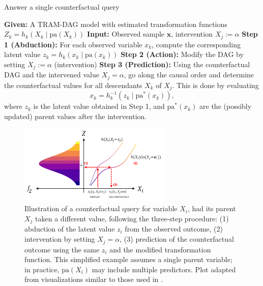 \begin{algorithm}[!ht]
\caption{Answer a single counterfactual query}
\label{alg:single_cf}
\begin{algorithmic}
\State \textbf{Given:} A TRAM-DAG model with estimated transformation functions $Z_k = h_k(X_k \mid \text{pa}(X_k))$
\State \textbf{Input:} Observed sample $\mathbf{x}$, intervention $X_j := \alpha$
\vspace{0.3em}
\State \textbf{Step 1 (Abduction):} For each observed variable $x_k$, compute the corresponding latent value $z_k = h_k(x_k \mid \text{pa}(x_k))$
\vspace{0.3em}
\State \textbf{Step 2 (Action):} Modify the DAG by setting $X_j := \alpha$ (intervention)
\vspace{0.3em}
\State \textbf{Step 3 (Prediction):} Using the counterfactual DAG and the intervened value $X_j = \alpha$, go along the causal order and determine the counterfactual values for all descendants $X_k$ of $X_j$. This is done by evaluating
\[
x_k = h_k^{-1}(z_k \mid \text{pa}^*(x_k)),
\]
where $z_k$ is the latent value obtained in Step 1, and $\text{pa}^*(x_k)$ are the (possibly updated) parent values after the intervention.
\end{algorithmic}
\end{algorithm}

\begin{figure}[!ht]
\centering
\includegraphics[width=0.65\textwidth]{img/counterfactuals.png}
\caption{Illustration of a counterfactual query for variable $X_i$, had its parent $X_j$ taken a different value, following the three-step procedure: (1) abduction of the latent value $z_i$ from the observed outcome, (2) intervention by setting $X_j = \alpha$, (3) prediction of the counterfactual outcome using the same $z_i$ and the modified transformation function. This simplified example assumes a single parent variable; in practice, $\text{pa}(X_i)$ may include multiple predictors. Plot adapted from visualizations similar to those used in \citet{sick2025}.}
\label{fig:cf_viz}
\end{figure}



